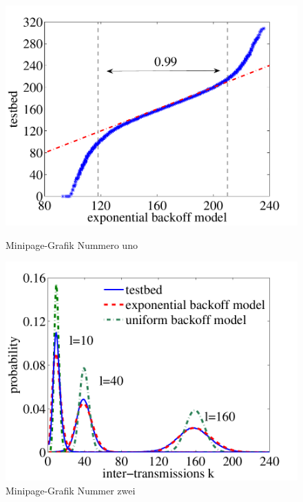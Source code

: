 \begin{figure}[htbp]
  \centering
  \begin{minipage}[b]{5 cm}
    \includegraphics[width=\linewidth]{4.graphics/figures/qq-plot_gaus_vs_160} 
    \caption{Minipage-Grafik Nummero uno}
    \label{fig:chapter03:minipage:grafik1}
  \end{minipage}
  \begin{minipage}[b]{5 cm}
    \includegraphics[width=\linewidth]{4.graphics/figures/pdf_gaus_vs_uni_vs_10_40_160}  
    \caption{Minipage-Grafik Nummer zwei}
    \label{fig:chapter03:minipage:grafik2}
  \end{minipage}
\end{figure}



